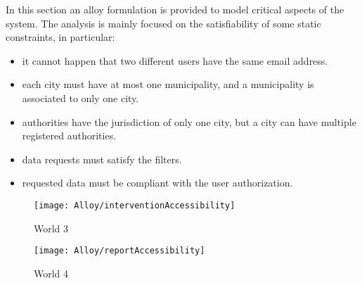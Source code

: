 In this section an alloy formulation is provided to model critical aspects of the system. The analysis is mainly focused on the satisfiability of some static constraints, in particular:
\begin{itemize}
	\item it cannot happen that two different users have the same email address.
	\item each city must have at most one municipality, and a municipality is associated to only one city.
	\item authorities have the jurisdiction of only one city, but a city can have multiple registered authorities.
	\item data requests must satisfy the filters.
	\item requested data must be compliant with the user authorization.
\end{itemize}

\vspace{10mm}



\begin{figure}[H]
	\centering
	\texttt{[image: Alloy/interventionAccessibility]}
	\caption{World 3}
\end{figure}

\begin{figure}[H]
	\centering
	\texttt{[image: Alloy/reportAccessibility]}
	\caption{World 4}
\end{figure}
